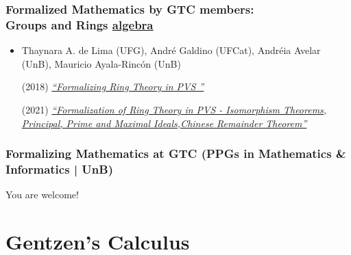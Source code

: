 \documentclass[10pt]{beamer}
\begin{document}
\begin{frame}[fragile]
  \frametitle{Formalized Mathematics by GTC members:\\
   Groups and Rings  \hfill \href{https://github.com/nasa/pvslib/tree/master/algebra}{\color{blue} algebra}}



{\footnotesize 
  \begin{itemize}
    
  \item  Thaynara A. de Lima (UFG), André Galdino (UFCat), Andréia
    Avelar (UnB), Mauricio Ayala-Rincón (UnB)


     (2018)
    \href{https://doi.org/10.1007/978-3-319-94821-8_3}{\color{blue}\scriptsize\it
      ``Formalizing Ring Theory in PVS ''}
    
     (2021)
    \href{https://doi.org/10.1007/s10817-021-09593-0}{\color{blue}\scriptsize\it
        ``Formalization of Ring Theory in PVS - Isomorphism Theorems,
        Principal, Prime and Maximal Ideals,Chinese Remainder
        Theorem''}


\end{itemize}
}

\end{frame}


\begin{frame}[fragile]
\frametitle{Formalizing Mathematics at GTC (PPGs in Mathematics \& Informatics | UnB)}


You are welcome!

\vspace{1cm}

\hspace{.3cm} 
\hspace{.3cm}   \hspace{.3cm} 
\hspace{.3cm}  



\end{frame}








\section{Gentzen's Calculus}
\end{document}
